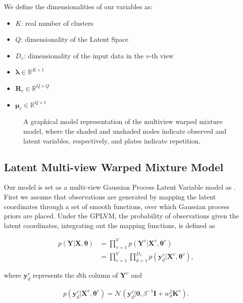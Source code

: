 \documentclass[]{article}
\newcommand{\gD}[2]{\mathcal{N}\left(#1,#2\right)}
\newcommand{\eye}{\mathbf{I}}
\newcommand{\setYv}{\mathbf{Y}^{v}}
\newcommand{\setY}{\mathbf{Y}}
\newcommand{\setXv}{\mathbf{X}^{v}}
\newcommand{\setKv}{\mathbf{K}^{v}}
\newcommand{\setX}{\mathbf{X}}
\newcommand{\hParams}{\boldsymbol{\theta}}
\newcommand{\hParamsv}{\boldsymbol{\theta}^{v}}
\begin{document}
We define the dimensionalities of our variables as:

\begin{itemize}
	\item 	$K$: real number of clusters
	\item $Q$:  dimensionality of the Latent Space
	\item $D_v$: dimensionality of the input data in the $v$-th view 
	\item $\boldsymbol{\lambda} \in \mathbb{R}^{K\times 1}$ 
	\item $\mathbf{R}_c \in \mathbb{R}^{Q\times Q}$
	\item $\boldsymbol{\mu}_c \in \mathbb{R}^{Q\times 1}$
\end{itemize}


\begin{figure}
	\centering      
	\caption{A graphical model representation of the multiview warped mixture model, where the shaded and unshaded
		nodes indicate observed and latent variables,
		respectively, and plates indicate repetition.}
\end{figure}


\subsection{Latent Multi-view Warped Mixture Model}

Our model is set as a multi-view Gaussian Process Latent Variable model as \cite{Lawrence03}. First we assume 
that observations are generated by mapping the latent coordinates through a set of smooth functions, over
which Gaussian process priors are placed. Under the GPLVM, the probability of observations given the latent
coordinates, integrating out the mapping functions, is defined as

\begin{align}
p\left(\setY|\setX,\hParams\right) &= \prod_{v=1}^{V}p\left(\setYv|\setXv,\hParamsv\right) \\
   &= \prod_{v=1}^{V}\prod_{d=1}^{D_v}p\left(\mathbf{y}_d^v|\setXv,\hParamsv\right),
\end{align}


where $\mathbf{y}_d^v$ represents the $d$th column of $\setYv$ and

\begin{align}
p\left(\mathbf{y}_d^v|\setXv,\hParamsv\right) = \gD{\mathbf{y}_d^v|\mathbf{0}}{\beta^{-1}\eye + w_d^2\setKv}.
\end{align}
\end{document}
